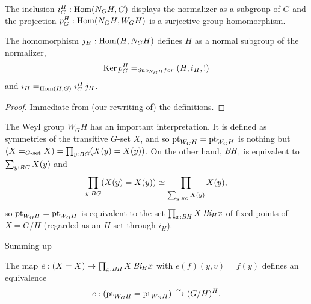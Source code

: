 

\begin{lemma}
  The inclusion $i_G^H:\Hom(N_GH,G)$ displays the normalizer as a subgroup of $G$ and the projection $p_G^H:\Hom(N_GH,W_GH)$ is a surjective group homomorphism.  

The homomorphism $j_H:\Hom(H,N_GH)$ defines $H$ as a normal subgroup of the normalizer,
$$\ker p_G^H=_{\typesubgroup_{N_GH}for}(H,i_H,!)$$
and $i_H=_{\Hom(H,G)}i_G^H\,j_H$.
\end{lemma}
\begin{proof}
  Immediate from (our rewriting of) the definitions.
\end{proof}

The Weyl group $W_GH$ has an important interpretation.  It is defined as symmetries of the transitive $G$-set $X$, and so $\mathrm{pt}_{W_GH}=\mathrm{pt}_{W_GH}$ is nothing but $(X=_{G\text{-set}}X)=\prod_{y:\mathit{B}\mathit{G}}(X(y)=X(y))$.  On the other hand, $\BH_\div$ is equivalent to $\sum_{y:\mathit{B}\mathit{G}}X(y)$ and 
$$\prod_{y:\mathit{B}\mathit{G}}(X(y)=X(y))\simeq \prod_{\sum_{y:\mathit{B}\mathit{G}}X(y)}X(y),$$ so $\mathrm{pt}_{W_GH}=\mathrm{pt}_{W_GH}$ is equivalent to the set $%
\prod_{x:\BH}X\, \Bi_Hx$ of fixed points of $X=G/H$ (regarded as an $H$-set through $i_H$).

Summing up
\begin{lemma}
  \label{lem:WGHisHfixofG/H}
  The map  $e:(X=X)\to \prod_{x:\mathit{B}\mathit{H}}X\, \mathit{B}\mathit{i}_Hx$ with $e(f)(y,v)=f(y)$ defines an equivalence
$$e:(\mathrm{pt}_{W_GH}=\mathrm{pt}_{W_GH})\xrightarrow{\sim} (G/H)^H.$$ 
\end{lemma}


